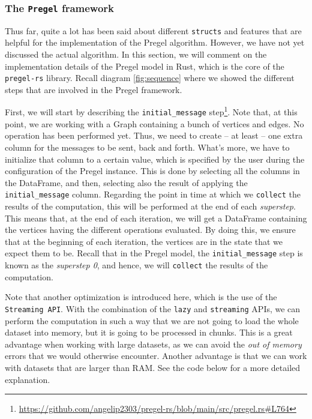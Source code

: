 \begin{code}
    \inputminted{rust}{code/listings/11-1_graph.rs}
\end{code}

\subsubsection{The \texttt{Pregel} framework}

Thus far, quite a lot has been said about different \texttt{structs} and features that are helpful for the implementation of the Pregel algorithm. However, we have not yet discussed the actual algorithm. In this section, we will comment on the implementation details of the Pregel model in Rust, which is the core of the \texttt{pregel-rs} library. Recall diagram \ref{fig:sequence} where we showed the different steps that are involved in the Pregel framework.

First, we will start by describing the \texttt{initial\_message} step\footnote{\url{https://github.com/angelip2303/pregel-rs/blob/main/src/pregel.rs\#L764}}. Note that, at this point, we are working with a Graph containing a bunch of vertices and edges. No operation has been performed yet. Thus, we need to create -- at least -- one extra column for the messages to be sent, back and forth. What's more, we have to initialize that column to a certain value, which is specified by the user during the configuration of the Pregel instance. This is done by selecting all the columns in the DataFrame, and then, selecting also the result of applying the \texttt{initial\_message} column. Regarding the point in time at which we \texttt{collect} the results of the computation, this will be performed at the end of each \textit{superstep}. This means that, at the end of each iteration, we will get a DataFrame containing the vertices having the different operations evaluated. By doing this, we ensure that at the beginning of each iteration, the vertices are in the state that we expect them to be. Recall that in the Pregel model, the \texttt{initial\_message} step is known as the \textit{superstep 0}, and hence, we will \texttt{collect} the results of the computation.

Note that another optimization is introduced here, which is the use of the \texttt{Streaming API}. With the combination of the \texttt{lazy} and \texttt{streaming} APIs, we can perform the computation in such a way that we are not going to load the whole dataset into memory, but it is going to be processed in chunks. This is a great advantage when working with large datasets, as we can avoid the \textit{out of memory} errors that we would otherwise encounter. Another advantage is that we can work with datasets that are larger than RAM. See the code below for a more detailed explanation.

